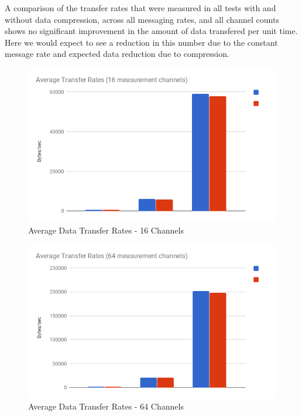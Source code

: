       A comparison of the transfer rates that were measured in all tests with
      and without data compression, across all messaging rates, and all channel
      counts shows no significant improvement in the amount of data transfered
      per unit time. Here we would expect to see a reduction in this number due
      to the constant message rate and expected data reduction due to
      compression.

      \begin{figure}[H]
        \includegraphics[width=\textwidth]{figures/testing/compression/16mps-avg-tx}
        \caption{Average Data Transfer Rates - 16 Channels}
        \label{fig:zlib-tests-tx-16}
      \end{figure}

      \begin{figure}[H]
        \includegraphics[width=\textwidth]{figures/testing/compression/64mps-avg-tx}
        \caption{Average Data Transfer Rates - 64 Channels}
        \label{fig:zlib-tests-tx-64}
      \end{figure}

